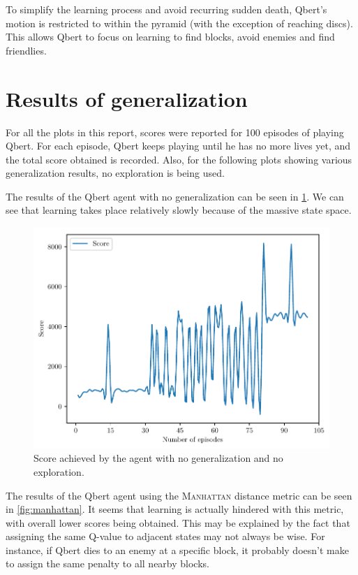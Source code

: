 \documentclass[a4paper,titlepage]{article}
\begin{document}
	To simplify the learning process and avoid recurring sudden death, Qbert's motion is restricted to within the pyramid (with the exception of reaching discs). This allows Qbert to focus on learning to find blocks, avoid enemies and find friendlies.
	
	\section{Results of generalization}
	
	For all the plots in this report, scores were reported for 100 episodes of playing Qbert. For each episode, Qbert keeps playing until he has no more lives yet, and the total score obtained is recorded. Also, for the following plots showing various generalization results, no exploration is being used.
	
	The results of the Qbert agent with no generalization can be seen in \cref{fig:no_generalization}. We can see that learning takes place relatively slowly because of the massive state space.
	
	\begin{figure}[!htb]
		\centering
		\includegraphics[width=\columnwidth]{plots/no_generalization.pdf}
		\caption
		{Score achieved by the agent with no generalization and no exploration.}
		\label{fig:no_generalization}
	\end{figure}

	The results of the Qbert agent using the \textsc{Manhattan} distance metric can be seen in \cref{fig:manhattan}. It seems that learning is actually hindered with this metric, with overall lower scores being obtained. This may be explained by the fact that assigning the same Q-value to adjacent states may not always be wise. For instance, if Qbert dies to an enemy at a specific block, it probably doesn't make to assign the same penalty to all nearby blocks.
\end{document}
